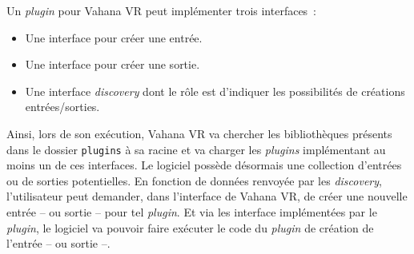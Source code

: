 Un \textit{plugin} pour Vahana VR peut implémenter trois interfaces~:
\begin{itemize}
  \item Une interface pour créer une entrée.
  \item Une interface pour créer une sortie.
  \item Une interface \textit{discovery} dont le rôle est d'indiquer les possibilités
    de créations entrées/sorties.
\end{itemize}
Ainsi, lors de son exécution, Vahana VR va chercher les bibliothèques présents dans le dossier
\texttt{plugins} à sa racine et va charger les \textit{plugins} implémentant
au moins un de ces interfaces. Le logiciel possède désormais une collection d'entrées
ou de sorties potentielles. En fonction de données renvoyée par les \textit{discovery},
l'utilisateur peut demander, dans l'interface de Vahana VR, de 
créer une nouvelle entrée -- ou sortie -- pour tel \textit{plugin}. Et via les
interface implémentées par le \textit{plugin}, le logiciel va pouvoir faire exécuter le code
du \textit{plugin} de création de l'entrée -- ou sortie --.\\


